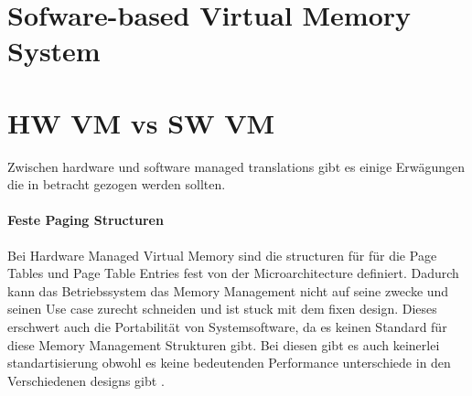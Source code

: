 \section{Sofware-based Virtual Memory System}






\section{HW VM vs SW VM}
Zwischen hardware und software managed translations gibt es einige Erwägungen die in betracht
gezogen werden sollten.

\paragraph{Feste Paging Structuren} Bei Hardware Managed Virtual Memory sind die structuren für
für die Page Tables und Page Table Entries fest von der Microarchitecture definiert.
Dadurch kann das Betriebssystem das Memory Management nicht auf seine zwecke und seinen Use case
zurecht schneiden und ist stuck mit dem fixen design.
Dieses erschwert auch die Portabilität von Systemsoftware, da es keinen Standard für diese
Memory Management Strukturen gibt.
Bei diesen gibt es auch keinerlei standartisierung obwohl es keine bedeutenden Performance unterschiede
in den Verschiedenen designs  gibt \cite{jacob1998look}.

